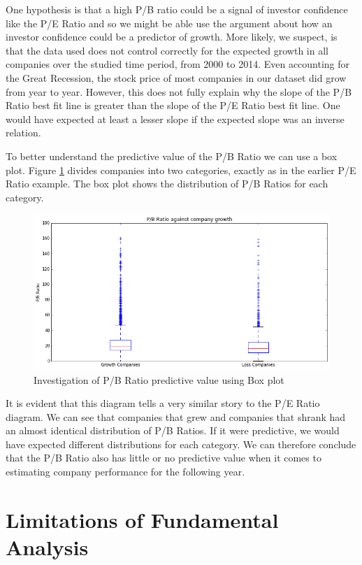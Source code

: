 \documentclass{report}
\begin{document}
One hypothesis is that a high P/B ratio could be a signal of investor confidence like the P/E Ratio and so we might be able use the argument about how an investor confidence could be a predictor of growth. More likely, we suspect, is that the data used does not control correctly for the expected growth in all companies over the studied time period, from 2000 to 2014. Even accounting for the Great Recession, the stock price of most companies in our dataset did grow from year to year. However, this does not fully explain why the slope of the P/B Ratio best fit line is greater than the slope of the P/E Ratio best fit line. One would have expected at least a lesser slope if the expected slope was an inverse relation. 

To better understand the predictive value of the P/B Ratio we can use a box plot. Figure \ref{fig:pb-box} divides companies into two categories, exactly as in the earlier P/E Ratio example. The box plot shows the distribution of P/B Ratios for each category.

\begin{figure}[H]
	\caption{Investigation of P/B Ratio predictive value using Box plot}
	\centerline{\includegraphics[width=\textwidth]{vis/pb_box.png}}
	\label{fig:pb-box}
\end{figure}

It is evident that this diagram tells a very similar story to the P/E Ratio diagram. We can see that companies that grew and companies that shrank had an almost identical distribution of P/B Ratios. If it were predictive, we would have expected different distributions for each category. We can therefore conclude that the P/B Ratio also has little or no predictive value when it comes to estimating company performance for the following year.

\section{Limitations of Fundamental Analysis}
\end{document}
